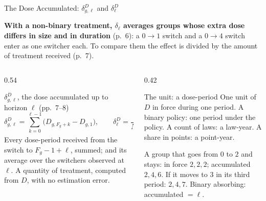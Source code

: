 \documentclass[main.tex]{subfiles}
\begin{document}
\begin{frame}{The Dose Accumulated: $\delta^{D}_{g,\ell}$ and $\delta^{D}_\ell$}

  \textbf{With a non-binary treatment, $\delta_\ell$ averages groups whose extra
  dose differs in size and in duration} (p.~6): a $0\!\to\!1$ switch and a
  $0\!\to\!4$ switch enter as one switcher each. To compare them the effect
  is divided by the amount of treatment received (p.~7).

  \medskip
  \begin{columns}[T]
    \begin{column}{0.54\textwidth}
      \begin{defbox}{$\delta^{D}_{g,\ell}$, the dose accumulated up to horizon $\ell$ (pp.~7--8)}
        \footnotesize
        \[
          \delta^{D}_{g,\ell} = \sum_{k=0}^{\ell-1}\big(D_{g,F_g+k}-D_{g,1}\big),
          \qquad
          \delta^{D}_\ell = \frac{1}{N_\ell}\sum_{g:\, F_g-1+\ell \le T_g} \big|\delta^{D}_{g,\ell}\big|
        \]
        Every dose-period received from the switch to $F_g-1+\ell$, summed;
        and its average over the switchers observed at $\ell$. A quantity of
        treatment, computed from $D$, with no estimation error.
      \end{defbox}
    \end{column}
    \begin{column}{0.42\textwidth}
      \begin{block}{\footnotesize The unit: a dose-period}
        \footnotesize
        One unit of $D$ in force during one period. A binary policy: one
        period under the policy. A count of laws: a law-year. A share in
        points: a point-year.
      \end{block}

      \smallskip
      \footnotesize A group that goes from $0$ to $2$ and stays: in force
      $2, 2, 2$; accumulated $2, 4, 6$. If it moves to $3$ in its third
      period: $2, 4, 7$. Binary absorbing: accumulated $= \ell$.
    \end{column}
  \end{columns}

\end{frame}
\end{document}
